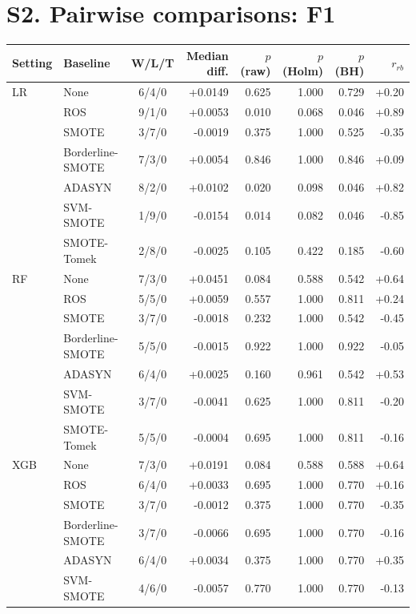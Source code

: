 \documentclass[10pt,a4paper]{article}
\begin{document}
\section*{S2. Pairwise comparisons: F1}
\begin{center}\footnotesize\begin{longtable}{@{}llcrrrrr@{}}\toprule Setting & Baseline & W/L/T & Median diff. & $p$ (raw) & $p$ (Holm) & $p$ (BH) & $r_{rb}$ \\ \midrule\endhead
LR & None & 6/4/0 & +0.0149 & 0.625 & 1.000 & 0.729 & +0.20 \\
 & ROS & 9/1/0 & +0.0053 & 0.010 & 0.068 & 0.046 & +0.89 \\
 & SMOTE & 3/7/0 & -0.0019 & 0.375 & 1.000 & 0.525 & -0.35 \\
 & Borderline-SMOTE & 7/3/0 & +0.0054 & 0.846 & 1.000 & 0.846 & +0.09 \\
 & ADASYN & 8/2/0 & +0.0102 & 0.020 & 0.098 & 0.046 & +0.82 \\
 & SVM-SMOTE & 1/9/0 & -0.0154 & 0.014 & 0.082 & 0.046 & -0.85 \\
 & SMOTE-Tomek & 2/8/0 & -0.0025 & 0.105 & 0.422 & 0.185 & -0.60 \\
\midrule
RF & None & 7/3/0 & +0.0451 & 0.084 & 0.588 & 0.542 & +0.64 \\
 & ROS & 5/5/0 & +0.0059 & 0.557 & 1.000 & 0.811 & +0.24 \\
 & SMOTE & 3/7/0 & -0.0018 & 0.232 & 1.000 & 0.542 & -0.45 \\
 & Borderline-SMOTE & 5/5/0 & -0.0015 & 0.922 & 1.000 & 0.922 & -0.05 \\
 & ADASYN & 6/4/0 & +0.0025 & 0.160 & 0.961 & 0.542 & +0.53 \\
 & SVM-SMOTE & 3/7/0 & -0.0041 & 0.625 & 1.000 & 0.811 & -0.20 \\
 & SMOTE-Tomek & 5/5/0 & -0.0004 & 0.695 & 1.000 & 0.811 & -0.16 \\
\midrule
XGB & None & 7/3/0 & +0.0191 & 0.084 & 0.588 & 0.588 & +0.64 \\
 & ROS & 6/4/0 & +0.0033 & 0.695 & 1.000 & 0.770 & +0.16 \\
 & SMOTE & 3/7/0 & -0.0012 & 0.375 & 1.000 & 0.770 & -0.35 \\
 & Borderline-SMOTE & 3/7/0 & -0.0066 & 0.695 & 1.000 & 0.770 & -0.16 \\
 & ADASYN & 6/4/0 & +0.0034 & 0.375 & 1.000 & 0.770 & +0.35 \\
 & SVM-SMOTE & 4/6/0 & -0.0057 & 0.770 & 1.000 & 0.770 & -0.13 \\

\end{longtable}
\end{center}
\end{document}
